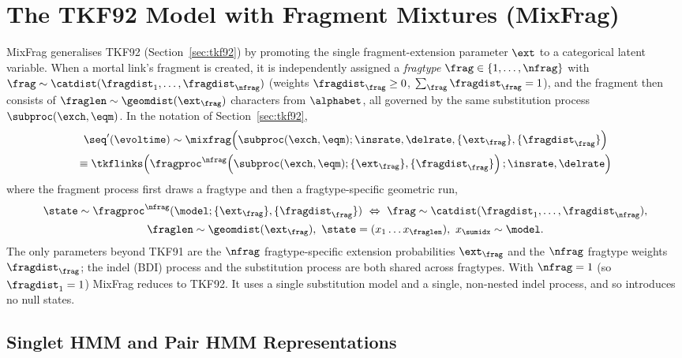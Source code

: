 \section{The TKF92 Model with Fragment Mixtures (MixFrag)}
\label{sec:mixfrag}

MixFrag generalises TKF92 (Section~\ref{sec:tkf92}) by promoting the single
fragment-extension parameter $\ext$ to a categorical latent variable.
When a mortal link's fragment is created, it is independently assigned a
\emph{fragtype} $\frag \in \{1,\ldots,\nfrag\}$ with
$\frag \sim \catdist(\fragdist_1,\ldots,\fragdist_\nfrag)$
(weights $\fragdist_\frag \geq 0$, $\sum_\frag \fragdist_\frag = 1$),
and the fragment then consists of $\fraglen \sim \geomdist(\ext_\frag)$
characters from $\alphabet$, all governed by the same substitution process
$\subproc(\exch,\eqm)$.
In the notation of Section~\ref{sec:tkf92},
\begin{multline*}
\seq'(\evoltime) \sim
\mixfrag\!\left(\subproc(\exch,\eqm);\insrate,\delrate,
\{\ext_\frag\},\{\fragdist_\frag\}\right) \\
\equiv
\tkflinks\!\left(\fragproc^\nfrag\!\left(\subproc(\exch,\eqm);
\{\ext_\frag\},\{\fragdist_\frag\}\right);\insrate,\delrate\right)
\end{multline*}
where the fragment process first draws a fragtype and then a fragtype-specific
geometric run,
\begin{multline*}
\state \sim \fragproc^\nfrag(\model;\{\ext_\frag\},\{\fragdist_\frag\})
\ \Leftrightarrow\
\frag \sim \catdist(\fragdist_1,\ldots,\fragdist_\nfrag), \\
\fraglen \sim \geomdist(\ext_\frag),\
\state = (x_1 \ldots x_\fraglen),\ x_\sumidx \sim \model.
\end{multline*}
The only parameters beyond TKF91 are the $\nfrag$ fragtype-specific extension
probabilities $\ext_\frag$ and the $\nfrag$ fragtype weights $\fragdist_\frag$;
the indel (BDI) process and the substitution process are both shared across
fragtypes.
With $\nfrag = 1$ (so $\fragdist_1 = 1$) MixFrag reduces to TKF92.
It uses a single substitution model and a single, non-nested indel process, and
so introduces no null states.


\subsection{Singlet HMM and Pair HMM Representations}
\label{sec:mixfrag-machines}

